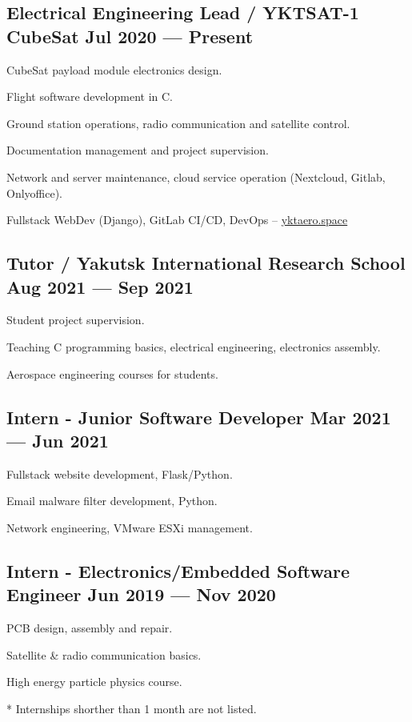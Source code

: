 \documentclass[letter,10pt]{article}
\begin{document}
\subsection{{Electrical Engineering Lead / YKTSAT-1 CubeSat \hfill Jul 2020 --- Present}}
\begin{zitemize}
\item CubeSat payload module electronics design.
\item Flight software development in C.
\item Ground station operations, radio communication and satellite control.
\item Documentation management and project supervision.
\item Network and server maintenance, cloud service operation (Nextcloud, Gitlab, Onlyoffice).
\item Fullstack WebDev (Django), GitLab CI/CD, DevOps -- \url{yktaero.space}
\end{zitemize}

\subsection{{Tutor / Yakutsk International Research School \hfill Aug 2021 --- Sep 2021}}
\begin{zitemize}
\item Student project supervision.
\item Teaching C programming basics, electrical engineering, electronics assembly.
\item Aerospace engineering courses for students.
\end{zitemize}

\subsection{{Intern - Junior Software Developer \hfill Mar 2021 --- Jun 2021}}
\begin{zitemize}
\item Fullstack website development, Flask/Python.
\item Email malware filter development, Python.
\item Network engineering, VMware ESXi management.
\end{zitemize}

\subsection{{Intern - Electronics/Embedded Software Engineer \hfill Jun 2019 --- Nov 2020}}
\begin{zitemize}
\item PCB design, assembly and repair.
\item Satellite & radio communication basics.
\item High energy particle physics course.
\end{zitemize}

* Internships shorther than 1 month are not listed.
\end{document}
